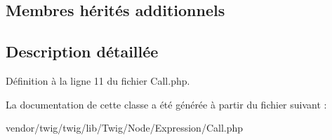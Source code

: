 \subsection*{Membres hérités additionnels}


\subsection{Description détaillée}


Définition à la ligne 11 du fichier Call.\+php.



La documentation de cette classe a été générée à partir du fichier suivant \+:\begin{DoxyCompactItemize}
\item 
vendor/twig/twig/lib/\+Twig/\+Node/\+Expression/Call.\+php\end{DoxyCompactItemize}
